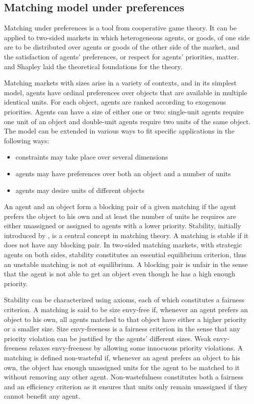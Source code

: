 \subsection{Matching model under preferences}\label{matching-model-under-preferences}%

Matching under preferences is a tool from cooperative game theory.
It can be applied to two-sided markets in which heterogeneous agents, or goods, of one side are to be distributed over agents or goods of the other side of the market, and the satisfaction of agents’ preferences, or respect for agents’ priorities, matter. \citet{gale_1962} and Shapley laid the theoretical foundations for the theory.

Matching markets with sizes arise in a variety of contexts, and in its simplest model, agents have ordinal preferences over objects that are available in multiple identical units. For each object, agents are ranked according to exogenous priorities. Agents can have a size of either one or two: single-unit agents require one unit of an object and double-unit agents require two units of the same object. The model can be extended in various ways to fit specific applications in the following ways:
\begin{itemize}
\item constraints may take place over several dimensions
\item agents may have preferences over both an object and a number of units
\item agents may desire units of different objects
\end{itemize}
An agent and an object form a blocking pair of a given matching if the agent prefers the object to his own and at least the number of units he requires are either unassigned or assigned to agents with a lower priority. Stability, initially introduced by \citet{gale_1962}, is a central concept in matching theory. A matching is stable if it does not have any blocking pair. In two-sided matching markets, with strategic agents on both sides, stability constitutes an essential equilibrium criterion, thus an unstable matching is not at equilibrium. A blocking pair is unfair in the sense that the agent is not able to get an object even though he has a high enough priority.

Stability can be characterized using axioms, each of which constitutes a fairness criterion. A matching is said to be size envy-free if, whenever an agent prefers an object to his own, all agents matched to that object have either a higher priority or a smaller size. Size envy-freeness is a fairness criterion in the sense that any priority violation can be justified by the agents' different sizes. Weak envy-freeness relaxes envy-freeness by allowing some innocuous priority violations. A matching is defined non-wasteful if, whenever an agent prefers an object to his own, the object has enough unassigned units for the agent to be matched to it without removing any other agent. Non-wastefulness constitutes both a fairness and an efficiency criterion as it ensures that units only remain unassigned if they cannot benefit any agent.

